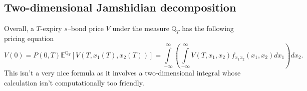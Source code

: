 \documentclass[11pt,a4paper]{article}
\numberwithin{equation}{section}
\begin{document}
\subsection{Two-dimensional Jamshidian decomposition}
Overall, a $T$-expiry $s$--bond price $V$ under the measure $\mathbb{Q}_T$ has the following pricing equation 
\begin{equation*}
  V(0) = P(0,T){\mathbb{E}^{{\mathbb{Q}_T}}}\left[ {V(T,{x_1}(T),{x_2}(T))} \right] = \int\limits_{ - \infty }^\infty  {\left( {\int\limits_{ - \infty }^\infty  {V(T,{x_1},{x_2}){f_{{x_1}{x_2}}}({x_1},{x_2})d{x_1}} } \right)d{x_2}}.
\end{equation*}
This isn't a very nice formula as it involves a two-dimensional integral whose calculation isn't computationally too friendly. 





\newpage
\end{document}
